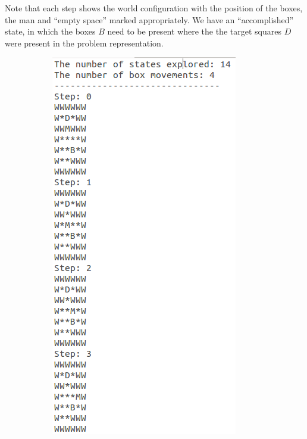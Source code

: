 \documentclass[10pt, letter]{article}
\begin{document}
Note that each step shows the world configuration with the position of the boxes, the man and ``empty space'' marked appropriately. We have an ``accomplished'' state, in which the boxes $B$ need to be present where the the target squares $D$ were present in the problem representation.
\begin{figure} [h!]
\centering
\begin{subfigure}{.3\textwidth}
  \centering
  \includegraphics[scale = 0.35]{images/sokoban1-ans1}
\end{subfigure}%
\begin{subfigure}{.3\textwidth}
  \centering

\end{subfigure}
\end{figure}
\end{document}
